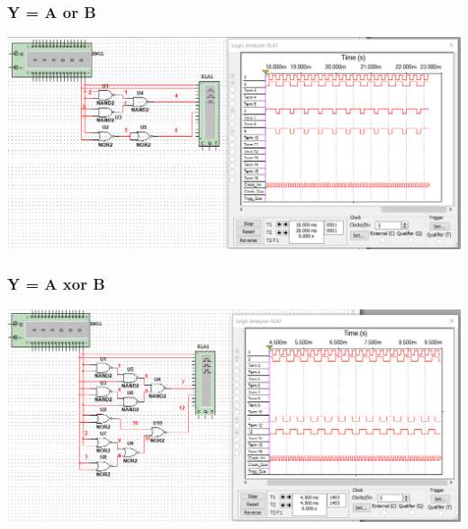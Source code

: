 \documentclass[12pt,a4paper]{article}
\begin{document}
\subsubsection{Y = A or B}
\includegraphics[width=\textwidth]{logic_analyzer/a_or_b}

\subsubsection{Y = A xor B}
\includegraphics[width=\textwidth]{logic_analyzer/a_xor_b}
\end{document}
